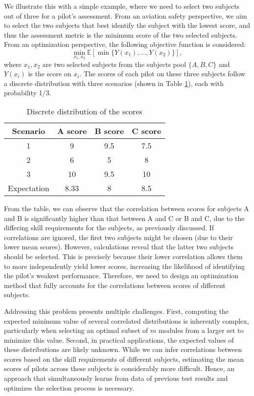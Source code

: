 \documentclass[opre,sglanonrev]{informs4}
\begin{document}
We illustrate this with a simple example, where we need to select two subjects out of three for a pilot's assessment. From an aviation safety perspective, we aim to select the two subjects that best identify the subject with the lowest score, and thus the assessment metric is the minimum score of the two selected subjects. From an optimization perspective, the following objective function is considered:
$$
	\min_{x_1,x_2} \mathbb{E}[\min\{Y(x_1),...,Y(x_2) \} ], 
	\label{example}
$$
where $x_1,x_2$ are two selected subjects from the subjects pool $\{A,B,C\}$ and $Y(x_i)$ is the score on $x_i$. The scores of each pilot on these three subjects follow a discrete distribution with three scenarios (shown in Table \ref{tab:example}), each with probability 1/3.
\begin{table}[ht]
	\centering
	\caption{Discrete distribution of the scores}
	\label{tab:example}
	\begin{tabular}{cccc} 
		Scenario & A score & B score & C score \\ \hline 
		1 & 9 & 9.5 & 7.5\\
		2 & 6 & 5 & 8\\
		3 & 10 & 9.5 & 10\\
		Expectation & 8.33 & 8 & 8.5\\
	\end{tabular}
\end{table}
From the table, we can observe that the correlation between scores for subjects A and B is significantly higher than that between A and C or B and C, due to the differing skill requirements for the subjects, as previously discussed. If correlations are ignored, the first two subjects might be chosen (due to their lower mean scores). However, calculations reveal that the latter two subjects should be selected. This is precisely because their lower correlation allows them to more independently yield lower scores, increasing the likelihood of identifying the pilot’s weakest performance. Therefore, we need to design an optimization method that fully accounts for the correlations between scores of different subjects.

Addressing this problem presents multiple challenges. First, computing the expected minimum value of several correlated distributions is inherently complex, particularly when selecting an optimal subset of $m$ modules from a larger set to minimize this value. Second, in practical applications, the expected values of these distributions are likely unknown. While we can infer correlations between scores based on the skill requirements of different subjects, estimating the mean scores of pilots across these subjects is considerably more difficult. Hence, an approach that simultaneously learns from data of previous test results and optimizes the selection process is necessary.
\end{document}
